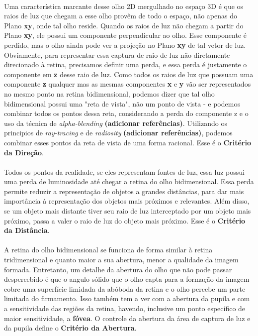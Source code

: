 \documentclass{article}
\begin{document}
	\paragraph{}
	Uma característica marcante desse olho 2D mergulhado no espaço 3D é que os raios de luz que chegam a esse olho provêm de todo o espaço, não apenas do Plano \textbf{xy}, onde tal olho reside. Quando os raios de luz não chegam a partir do Plano \textbf{xy}, ele possui um componente perpendicular ao olho. Esse componente é perdido, mas o olho ainda pode ver a projeção no Plano \textbf{xy} de tal vetor de luz. Obviamente, para representar essa captura de raio de luz não diretamente direcionado à retina, precisamos definir uma perda, e essa perda é justamente o componente em \textbf{z} desse raio de luz. Como todos os raios de luz que possuam uma componente \textbf{z} qualquer mas as mesmas componentes \textbf{x} e \textbf{y} vão ser representados no mesmo ponto na retina bidimensional, podemos dizer que tal olho bidimensional possui uma "reta de vista", não um ponto de vista - e podemos combinar todos os pontos dessa reta, considerando a perda do componente z e o uso da técnica de \textit{alpha-blending} \textbf{(adicionar referências)}. Utilizando os principios de \textit{ray-tracing} e de \textit{radiosity} \textbf{(adicionar referências)}, podemos combinar esses pontos da reta de vista de uma forma racional. Esse é o \textbf{Critério da Direção}.
	
	\paragraph{}
	Todos os pontos da realidade, se eles representam fontes de luz, essa luz possui uma perda de luminosidade até chegar a retina do olho bidimensional. Essa perda permite reduzir a representação de objetos a grandes distâncias, para dar mais importância à representação dos objetos mais próximos e relevantes. Além disso, se um objeto mais distante tiver seu raio de luz interceptado por um objeto mais próximo, passa a valer o raio de luz do objeto mais próximo. Esse é o \textbf{Critério da Distância}.
	
	\paragraph{}
	A retina do olho bidimensional se funciona de forma similar à retina tridimensional e quanto maior a sua abertura, menor a qualidade da imagem formada. Entretanto, um detalhe da abertura do olho que não pode passar despercebido é que o angulo sólido que o olho capta para a formação da imagem cobre uma superfície limidada da abóboda da retina e o olho percebe um parte limitada do firmamento. Isso também tem a ver com a abertura da pupila e com a sensitividade das regiões da retina, havendo, inclusive um ponto específico de maior sensitividade, a \textbf{fóvea}. O controle da abertura da área de captura de luz e da pupila define o \textbf{Critério da Abertura}.
	
\end{document}
